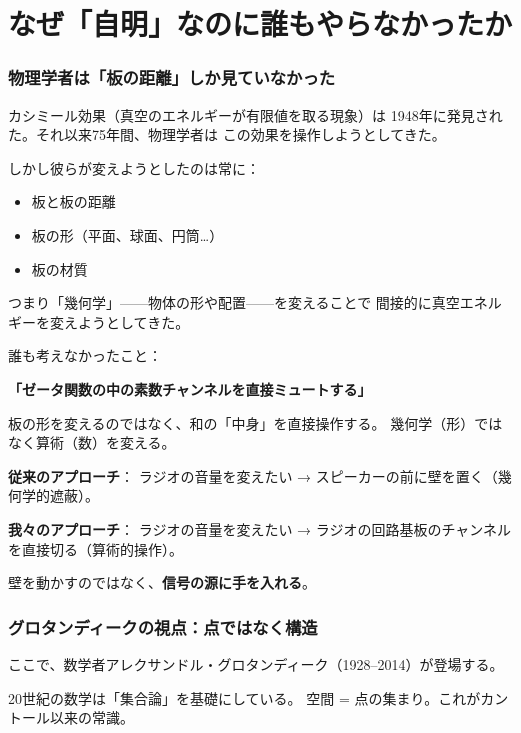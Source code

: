 \documentclass[12pt,a4paper]{article}
\begin{document}
\part{なぜ「自明」なのに誰もやらなかったか}

\section{物理学者は「板の距離」しか見ていなかった}

カシミール効果（真空のエネルギーが有限値を取る現象）は
1948年に発見された。それ以来75年間、物理学者は
この効果を操作しようとしてきた。

しかし彼らが変えようとしたのは常に：
\begin{itemize}
\item 板と板の距離
\item 板の形（平面、球面、円筒…）
\item 板の材質
\end{itemize}

つまり「幾何学」——物体の形や配置——を変えることで
間接的に真空エネルギーを変えようとしてきた。

誰も考えなかったこと：

\textbf{「ゼータ関数の中の素数チャンネルを直接ミュートする」}

板の形を変えるのではなく、和の「中身」を直接操作する。
幾何学（形）ではなく算術（数）を変える。

\begin{storybox}[たとえ話]
\textbf{従来のアプローチ}：
ラジオの音量を変えたい → スピーカーの前に壁を置く（幾何学的遮蔽）。

\textbf{我々のアプローチ}：
ラジオの音量を変えたい → ラジオの回路基板のチャンネルを直接切る（算術的操作）。

壁を動かすのではなく、\textbf{信号の源に手を入れる}。
\end{storybox}

\section{グロタンディークの視点：点ではなく構造}

ここで、数学者アレクサンドル・グロタンディーク（1928--2014）が登場する。

20世紀の数学は「集合論」を基礎にしている。
空間 = 点の集まり。これがカントール以来の常識。
\end{document}
